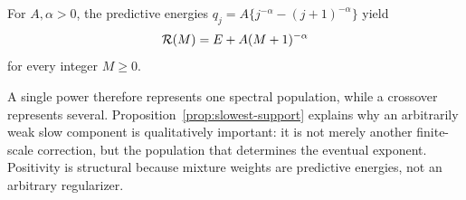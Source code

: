 \begin{corollary}
\label{cor:exact-power}
For $A,\alpha>0$, the predictive energies
$q_j=A\{j^{-\alpha}-(j+1)^{-\alpha}\}$ yield
\begin{equation}
 \mathcal{R}(M)=E+A(M+1)^{-\alpha}
 \label{eq:exact-power}
\end{equation}
for every integer $M\ge0$.
\end{corollary}

A single power therefore represents one spectral population, while a crossover represents several. Proposition~\ref{prop:slowest-support} explains why an arbitrarily weak slow component is qualitatively important: it is not merely another finite-scale correction, but the population that determines the eventual exponent. Positivity is structural because mixture weights are predictive energies, not an arbitrary regularizer.
